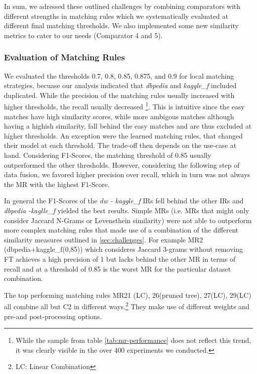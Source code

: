 \documentclass[11pt,titlepage,oneside,openany]{article}
\begin{document}
In sum, we adressed these outlined challenges by combining comparators with different strengths in matching rules which we systematically evaluated at different final matching thresholds. We also implemented some new similarity metrics to cater to our needs (Comparator 4 and 5).



\subsubsection{Evaluation of Matching Rules}

We evaluated the thresholds 0.7, 0.8, 0.85, 0.875, and 0.9 for local matching strategies, becuase our analysis indicated that \textit{dbpedia} and \textit{kaggle\_f} included duplicated. While the precision of the matching rules usually increased with higher thresholds, the recall usually decreased%
\footnote{While the sample from table \ref{tab:mr-performance} does not reflect this trend, it was clearly visible in the over 400 experiments we conducted.}.%
This is intuitive since the easy matches have high similarity scores, while more ambigous matches although having a highish similarity, fall behind the easy matches and are thus excluded at higher thresholds. An exception were the learned matching rules, that changed their model at each threshold. The trade-off then depends on the use-case at hand. Considering F1-Scores, the matching threshold of 0.85 usually outperformed the other thresholds. However, considering the following step of data fusion, we favored higher precision over recall, which in turn was not always the MR with the highest F1-Score.

In general the F1-Scores of the \textit{dw - kaggle\_f} IRs fell behind the other IRs and \textit{dbpedia -kaglle\_f} yielded the best results. Simple MRs (i.e. MRs that might only consider Jaccard N-Grams or Levensthein similarity) were not able to outperform more complex matching rules that made use of a combination of the different similarity measures outlined in \ref{sec:challenges}. For example MR2 (dbpedia+kaggle\_f(0,85)) which consideres Jaccard 3-grams without removing FT achieves a high precision of 1 but lacks behind the other MR in terms of recall and at a threshold of 0.85 is the worst MR for the particular dataset combination. 

The top performing matching rules MR21 (LC), 26(pruned tree), 27(LC), 29(LC) all combine all but C2 in different ways.\footnote{LC: Linear Combination}%
They make use of different weights and pre-and post-processing options.
\end{document}
